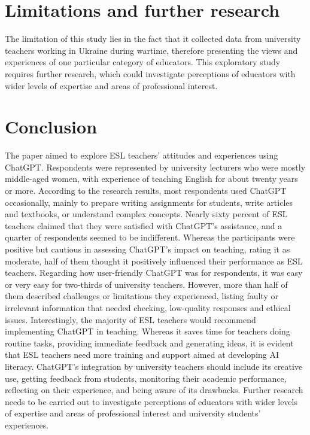 \documentclass[english]{textolivre}
\begin{document}
\section{Limitations and further research}
The limitation of this study lies in the fact that it collected data from university teachers working in Ukraine during wartime, therefore presenting the views and experiences of one particular category of educators. This exploratory study requires further research, which could investigate perceptions of educators with wider levels of expertise and areas of professional interest.

\section{Conclusion}
The paper aimed to explore ESL teachers’ attitudes and experiences using ChatGPT. Respondents were represented by university lecturers who were mostly middle-aged women, with experience of teaching English for about twenty years or more. According to the research results, most respondents used ChatGPT occasionally, mainly to prepare writing assignments for students, write articles and textbooks, or understand complex concepts. Nearly sixty percent of ESL teachers claimed that they were satisfied with ChatGPT’s assistance, and a quarter of respondents seemed to be indifferent. Whereas the participants were positive but cautious in assessing ChatGPT’s impact on teaching, rating it as moderate, half of them thought it positively influenced their performance as ESL teachers. Regarding how user-friendly ChatGPT was for respondents, it was easy or very easy for two-thirds of university teachers. However, more than half of them described challenges or limitations they experienced, listing faulty or irrelevant information that needed checking, low-quality responses and ethical issues. Interestingly, the majority of ESL teachers would recommend implementing ChatGPT in teaching. Whereas it saves time for teachers doing routine tasks, providing immediate feedback and generating ideas, it is evident that ESL teachers need more training and support aimed at developing AI literacy. ChatGPT’s integration by university teachers should include its creative use, getting feedback from students, monitoring their academic performance, reflecting on their experience, and being aware of its drawbacks. Further research needs to be carried out to investigate perceptions of educators with wider levels of expertise and areas of professional interest and university students’ experiences.
\end{document}
